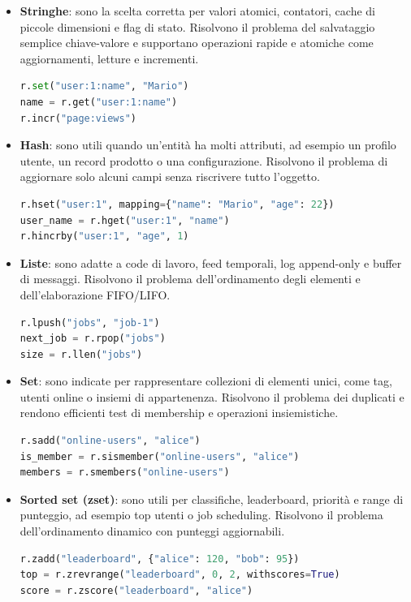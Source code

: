 \documentclass{article}
\begin{document}
\begin{itemize}
    \item \textbf{Stringhe}: sono la scelta corretta per valori atomici, contatori, cache di piccole dimensioni %
e flag di stato. Risolvono il problema del salvataggio semplice chiave-valore e supportano operazioni %
rapide e atomiche come aggiornamenti, letture e incrementi.
    \begin{lstlisting}[language=Python]
r.set("user:1:name", "Mario")
name = r.get("user:1:name")
r.incr("page:views")
    \end{lstlisting}
    \item \textbf{Hash}: sono utili quando un'entità ha molti attributi, ad esempio un profilo utente, un record %
prodotto o una configurazione. Risolvono il problema di aggiornare solo alcuni campi senza riscrivere %
tutto l'oggetto.
    \begin{lstlisting}[language=Python]
r.hset("user:1", mapping={"name": "Mario", "age": 22})
user_name = r.hget("user:1", "name")
r.hincrby("user:1", "age", 1)
    \end{lstlisting}
    \item \textbf{Liste}: sono adatte a code di lavoro, feed temporali, log append-only e buffer di messaggi. %
Risolvono il problema dell'ordinamento degli elementi e dell'elaborazione FIFO/LIFO.
    \begin{lstlisting}[language=Python]
r.lpush("jobs", "job-1")
next_job = r.rpop("jobs")
size = r.llen("jobs")
    \end{lstlisting}
    \item \textbf{Set}: sono indicate per rappresentare collezioni di elementi unici, come tag, utenti online %
o insiemi di appartenenza. Risolvono il problema dei duplicati e rendono efficienti test di membership %
e operazioni insiemistiche.
    \begin{lstlisting}[language=Python]
r.sadd("online-users", "alice")
is_member = r.sismember("online-users", "alice")
members = r.smembers("online-users")
    \end{lstlisting}
    \item \textbf{Sorted set (zset)}: sono utili per classifiche, leaderboard, priorità e range di punteggio, %
ad esempio top utenti o job scheduling. Risolvono il problema dell'ordinamento dinamico con punteggi %
aggiornabili.
    \begin{lstlisting}[language=Python]
r.zadd("leaderboard", {"alice": 120, "bob": 95})
top = r.zrevrange("leaderboard", 0, 2, withscores=True)
score = r.zscore("leaderboard", "alice")

\end{lstlisting}
\end{itemize}
\end{document}

